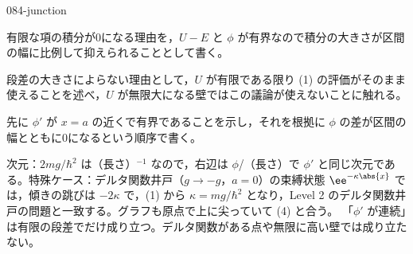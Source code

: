 \documentclass[uplatex,dvipdfmx,a4paper,11pt]{jsarticle}
\begin{document}
\begin{kaisetsu}{084-junction}
\begin{ronten}
  \item {} 有限な項の積分が0になる理由を，$U-E$ と $\phi$ が有界なので積分の大きさが区間の幅に比例して抑えられることとして書く。
  \item {} 段差の大きさによらない理由として，$U$ が有限である限り (1) の評価がそのまま使えることを述べ，$U$ が無限大になる壁ではこの議論が使えないことに触れる。
  \item {} 先に $\phi'$ が $x=a$ の近くで有界であることを示し，それを根拠に $\phi$ の差が区間の幅とともに0になるという順序で書く。
\end{ronten}
\kenzan 次元：$2mg/\hbar^{2}$ は（長さ）$^{-1}$ なので，右辺は $\phi$/（長さ）で $\phi'$ と同じ次元である。特殊ケース：デルタ関数井戸（$g\to-g$，$a=0$）の束縛状態 $\ee^{-\kappa\abs{x}}$ では，傾きの跳びは $-2\kappa$ で，(1) から $\kappa=mg/\hbar^{2}$ となり，Level 2 のデルタ関数井戸の問題と一致する。グラフも原点で上に尖っていて (4) と合う。
\tsumazuki 「$\phi'$ が連続」は有限の段差でだけ成り立つ。デルタ関数がある点や無限に高い壁では成り立たない。
\end{kaisetsu}
\end{document}

